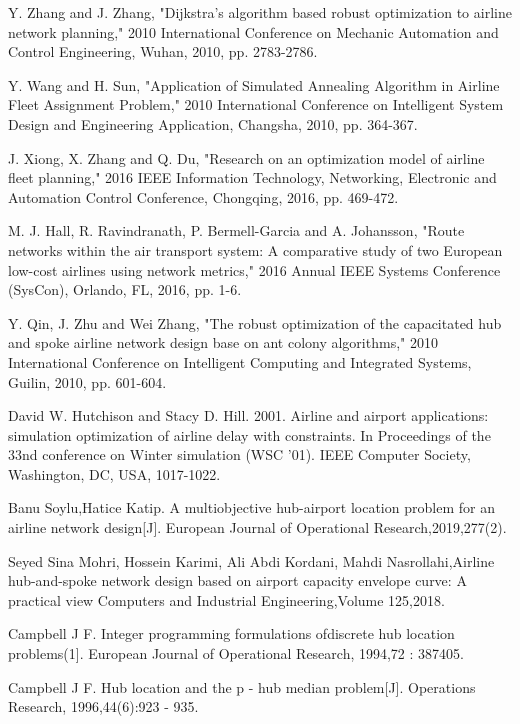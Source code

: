 \documentclass[runningheads]{llncs}
\begin{document}
\begin{thebibliography}{8}
Y. Zhang and J. Zhang, "Dijkstra's algorithm based robust optimization to airline network planning," 2010 International Conference on Mechanic Automation and Control Engineering, Wuhan, 2010, pp. 2783-2786.

Y. Wang and H. Sun, "Application of Simulated Annealing Algorithm in Airline Fleet Assignment Problem," 2010 International Conference on Intelligent System Design and Engineering Application, Changsha, 2010, pp. 364-367.

J. Xiong, X. Zhang and Q. Du, "Research on an optimization model of airline fleet planning," 2016 IEEE Information Technology, Networking, Electronic and Automation Control Conference, Chongqing, 2016, pp. 469-472.

M. J. Hall, R. Ravindranath, P. Bermell-Garcia and A. Johansson, "Route networks within the air transport system: A comparative study of two European low-cost airlines using network metrics," 2016 Annual IEEE Systems Conference (SysCon), Orlando, FL, 2016, pp. 1-6.

Y. Qin, J. Zhu and Wei Zhang, "The robust optimization of the capacitated hub and spoke airline network design base on ant colony algorithms," 2010 International Conference on Intelligent Computing and Integrated Systems, Guilin, 2010, pp. 601-604.

David W. Hutchison and Stacy D. Hill. 2001. Airline and airport applications: simulation optimization of airline delay with constraints. In Proceedings of the 33nd conference on Winter simulation (WSC '01). IEEE Computer Society, Washington, DC, USA, 1017-1022.

Banu Soylu,Hatice Katip. A multiobjective hub-airport location problem for an airline network design[J]. European Journal of Operational Research,2019,277(2).

Seyed Sina Mohri, Hossein Karimi, Ali Abdi Kordani, Mahdi Nasrollahi,Airline hub-and-spoke network design based on airport capacity envelope curve: A practical view Computers and Industrial Engineering,Volume 125,2018.

Campbell J F. Integer programming formulations ofdiscrete hub location problems(1]. European Journal of Operational Research, 1994,72 : 387405.

Campbell J F. Hub location and the p - hub median problem[J]. Operations Research, 1996,44(6):923 - 935.


\end{thebibliography}
\end{document}
